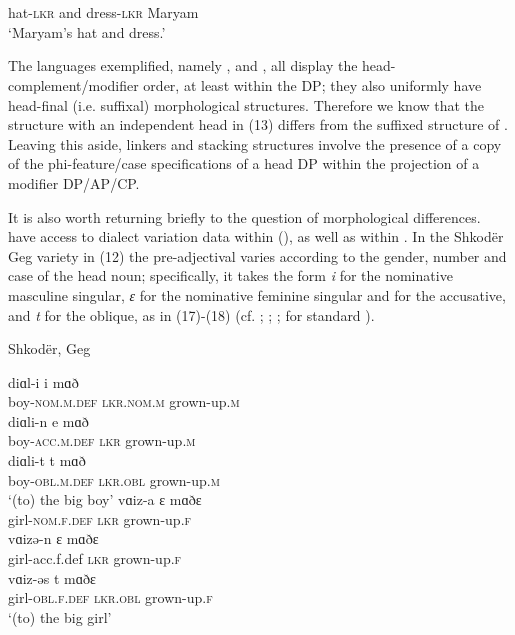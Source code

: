 \documentclass[output=paper]{langsci/langscibook}
\begin{document}
\ea%
          \citep[38]{Philip2012}\label{ex:manzini:16}\\
    \gll{} \\
          hat-\textsc{lkr}   and   dress-\textsc{lkr}   Maryam\\
    \glt  ‘Maryam’s hat and dress.’ 
\z
                    
The languages exemplified, namely ,  and , all display the head-complement\slash modifier order, at least within the DP; they also uniformly have head-final (i.e. suffixal) morphological structures. Therefore we know that the  structure with an independent head in (13) differs from the suffixed structure of . Leaving this aside, linkers and stacking structures involve the presence of a copy of the phi-feature\slash case specifications of a head DP within the projection of a modifier DP\slash AP\slash CP.   

It is also worth returning briefly to the question of morphological differences. \citet{Franco2015} have access to dialect variation data within  (\citealt{Manzini2011Grammatical,Manzini2011Reducing}), as well as within . In the Shkodër Geg  variety in (12) the pre-ad\-jec\-ti\-val  varies according to the gender, number and case of the head noun; specifically, it takes the form \textit{i} for the nominative masculine singular, \textit{ɛ} for the nominative feminine singular and for the accusative, and \textit{t} for the oblique, as in (17)-(18) (cf. \citealt{Solano1972}; \citealt{Camaj1984}; \citealt{Turano2004}; \citealt{Campos2008} for standard ).

\ea%
    Shkodër, Geg \label{ex:manzini:17}\\
    \begin{xlista}
    \ex
    \gll diɑl-i      i     mɑð           \\
         boy-\textsc{nom.m.def}   \textsc{lkr.nom.m}  grown-up.\textsc{m}\\
    \ex
    \gll diɑli-n     e     mɑð    \\
         boy-\textsc{acc.m.def}     \textsc{lkr}    grown-up.\textsc{m}\\
    \ex
    \gll diɑli-t              t     mɑð  \\
         boy-\textsc{obl.m.def}  \textsc{lkr.obl}  grown-up.\textsc{m}\\
    \glt ‘(to) the big boy’
    \gll vɑiz-a     ɛ     mɑðɛ    \\
         girl-\textsc{nom.f.def}   \textsc{lkr}    grown-up.\textsc{f} \\
    \gll vɑizə-n     ɛ     mɑðɛ    \\
         girl-acc.f.def    \textsc{lkr}    grown-up.\textsc{f}\\
    \gll vɑiz-əs    t     mɑðɛ \\
         girl-\textsc{obl.f.def}    \textsc{lkr.obl}  grown-up.\textsc{f}\\
    \glt ‘(to) the big girl’
    \end{xlista}
\z
\end{document}
